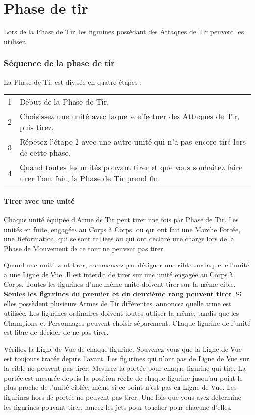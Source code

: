 
\part{Phase de tir}

Lors de la Phase de Tir, les figurines possédant des Attaques de Tir peuvent les utiliser.

\section{Séquence de la phase de tir}

La Phase de Tir est divisée en quatre étapes :

\hspace*{0.3cm}
\begin{tabular}{c|m{14cm}}
1 & Début de la Phase de Tir. \tabularnewline
2 & Choisissez une unité avec laquelle effectuer des Attaques de Tir, puis tirez. \tabularnewline
3 & Répétez l'étape 2 avec une autre unité qui n'a pas encore tiré lors de cette phase. \tabularnewline
4 & Quand toutes les unités pouvant tirer et que vous souhaitez faire tirer l'ont fait, la Phase de Tir prend fin. \tabularnewline
\end{tabular}

\subsection{Tirer avec une unité}

Chaque unité équipée d'Arme de Tir peut tirer une fois par Phase de Tir. Les unités en fuite, engagées au Corps à Corps, ou qui ont fait une Marche Forcée, une Reformation, qui se sont ralliées ou qui ont déclaré une charge lors de la Phase de Mouvement de ce tour ne peuvent pas tirer.

Quand une unité veut tirer, commencez par désigner une cible sur laquelle l'unité a une Ligne de Vue. Il est interdit de tirer sur une unité engagée au Corps à Corps. Toutes les figurines d'une même unité doivent tirer sur la même cible. \textbf{Seules les figurines du premier et du deuxième rang peuvent tirer}. Si elles possèdent plusieurs Armes de Tir différentes, annoncez quelle arme est utilisée. Les figurines ordinaires doivent toutes utiliser la même, tandis que les Champions et Personnages peuvent choisir séparément. Chaque figurine de l'unité est libre de décider de ne pas tirer.

Vérifiez la Ligne de Vue de chaque figurine. Souvenez-vous que la Ligne de Vue est toujours tracée depuis l'avant. Les figurines qui n'ont pas de Ligne de Vue sur la cible ne peuvent pas tirer. Mesurez la portée pour chaque figurine qui tire. La portée est mesurée depuis la position réelle de chaque figurine jusqu'au point le plus proche de l'unité ciblée, même si ce point n'est pas en Ligne de Vue. Les figurines hors de portée ne peuvent pas tirer. Une fois que vous avez déterminé les figurines pouvant tirer, lancez les jets pour toucher pour chacune d'elles.

